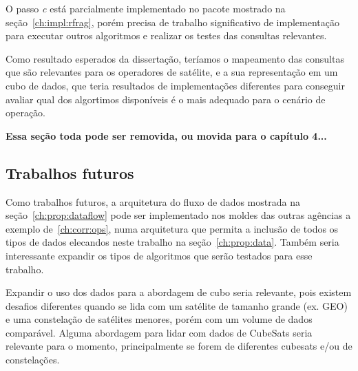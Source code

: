 O passo \textit{c} está parcialmente implementado no pacote mostrado na seção~\ref{ch:impl:rfrag}, porém precisa de trabalho significativo de implementação para executar outros algoritmos e realizar os testes das consultas relevantes.

Como resultado esperados da dissertação, teríamos o mapeamento das consultas que são relevantes para os operadores de satélite, e a sua representação em um cubo de dados, que teria resultados de implementações diferentes para conseguir avaliar qual dos algortimos disponíveis é o mais adequado para o cenário de operação.

{\color{red} \bfseries Essa seção toda pode ser removida, ou movida para o capítulo 4...}

\subsection{Trabalhos futuros}
\label{ch:concl:planning:future}

Como trabalhos futuros, a arquitetura do fluxo de dados mostrada na seção~\ref{ch:prop:dataflow} pode ser implementado nos moldes das outras agências a exemplo de~\ref{ch:corr:ops}, numa arquitetura que permita a inclusão de todos os tipos de dados elecandos neste trabalho na seção~\ref{ch:prop:data}.
Também seria interessante expandir os tipos de algoritmos que serão testados para esse trabalho.

Expandir o uso dos dados para a abordagem de cubo seria relevante, pois existem desafios diferentes quando se lida com um satélite de tamanho grande (ex. GEO) e uma constelação de satélites menores, porém com um volume de dados comparável.
Alguma abordagem para lidar com dados de CubeSats seria relevante para o momento, principalmente se forem de diferentes cubesats e/ou de constelações.

